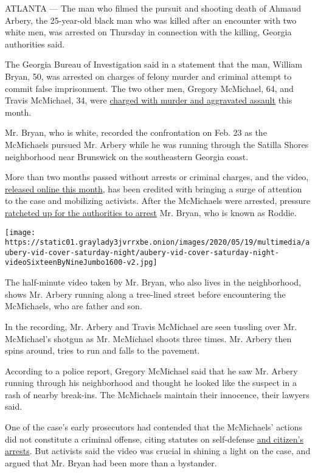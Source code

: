 ATLANTA --- The man who filmed the pursuit and shooting death of Ahmaud
Arbery, the 25-year-old black man who was killed after an encounter with
two white men, was arrested on Thursday in connection with the killing,
Georgia authorities said.

The Georgia Bureau of Investigation said in a statement that the man,
William Bryan, 50, was arrested on charges of felony murder and criminal
attempt to commit false imprisonment. The two other men, Gregory
McMichael, 64, and Travis McMichael, 34, were
\href{https://www.nytimes3xbfgragh.onion/2020/05/07/us/ahmaud-arbery-shooting-arrest.html}{charged
with murder and aggravated assault} this month.

Mr. Bryan, who is white, recorded the confrontation on Feb. 23 as the
McMichaels pursued Mr. Arbery while he was running through the Satilla
Shores neighborhood near Brunswick on the southeastern Georgia coast.

More than two months passed without arrests or criminal charges, and the
video,
\href{https://www.nytimes3xbfgragh.onion/2020/05/08/us/ahmaud-arbery-video-lawyer.html}{released
online this month}, has been credited with bringing a surge of attention
to the case and mobilizing activists. After the McMichaels were
arrested, pressure
\href{https://www.nytimes3xbfgragh.onion/2020/05/18/us/ahmaud-arbery-william-bryan.html}{ratcheted
up for the authorities to arrest} Mr. Bryan, who is known as Roddie.

\texttt{[image: https://static01.graylady3jvrrxbe.onion/images/2020/05/19/multimedia/aubery-vid-cover-saturday-night/aubery-vid-cover-saturday-night-videoSixteenByNineJumbo1600-v2.jpg]}

The half-minute video taken by Mr. Bryan, who also lives in the
neighborhood, shows Mr. Arbery running along a tree-lined street before
encountering the McMichaels, who are father and son.

In the recording, Mr. Arbery and Travis McMichael are seen tussling over
Mr. McMichael's shotgun as Mr. McMichael shoots three times. Mr. Arbery
then spins around, tries to run and falls to the pavement.

According to a police report, Gregory McMichael said that he saw Mr.
Arbery running through his neighborhood and thought he looked like the
suspect in a rash of nearby break-ins. The McMichaels maintain their
innocence, their lawyers said.

One of the case's early prosecutors had contended that the McMichaels'
actions did not constitute a criminal offense, citing statutes on
self-defense
\href{https://www.nytimes3xbfgragh.onion/article/ahmaud-arbery-citizen-arrest-law-georgia.html}{and
citizen's arrests}. But activists said the video was crucial in shining
a light on the case, and argued that Mr. Bryan had been more than a
bystander.

